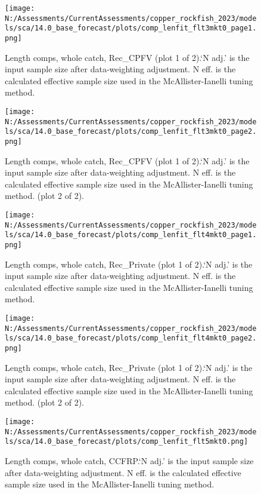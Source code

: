 \documentclass[11pt,
  english,
  letterpaper,
]{article}
\begin{document}
\begin{figure}
\centering
\texttt{[image: N:/Assessments/CurrentAssessments/copper\_rockfish\_2023/models/sca/14.0\_base\_forecast/plots/comp\_lenfit\_flt3mkt0\_page1.png]}
\caption{Length comps, whole catch, Rec\_CPFV (plot 1 of 2).`N adj.' is the input sample size after data-weighting adjustment. N eff. is the calculated effective sample size used in the McAllister-Ianelli tuning method.\label{fig:comp_lenfit_flt3mkt0_page1}}
\end{figure}

\begin{figure}
\centering
\texttt{[image: N:/Assessments/CurrentAssessments/copper\_rockfish\_2023/models/sca/14.0\_base\_forecast/plots/comp\_lenfit\_flt3mkt0\_page2.png]}
\caption{Length comps, whole catch, Rec\_CPFV (plot 1 of 2).`N adj.' is the input sample size after data-weighting adjustment. N eff. is the calculated effective sample size used in the McAllister-Ianelli tuning method. (plot 2 of 2).\label{fig:comp_lenfit_flt3mkt0_page2}}
\end{figure}

\begin{figure}
\centering
\texttt{[image: N:/Assessments/CurrentAssessments/copper\_rockfish\_2023/models/sca/14.0\_base\_forecast/plots/comp\_lenfit\_flt4mkt0\_page1.png]}
\caption{Length comps, whole catch, Rec\_Private (plot 1 of 2).`N adj.' is the input sample size after data-weighting adjustment. N eff. is the calculated effective sample size used in the McAllister-Ianelli tuning method.\label{fig:comp_lenfit_flt4mkt0_page1}}
\end{figure}

\begin{figure}
\centering
\texttt{[image: N:/Assessments/CurrentAssessments/copper\_rockfish\_2023/models/sca/14.0\_base\_forecast/plots/comp\_lenfit\_flt4mkt0\_page2.png]}
\caption{Length comps, whole catch, Rec\_Private (plot 1 of 2).`N adj.' is the input sample size after data-weighting adjustment. N eff. is the calculated effective sample size used in the McAllister-Ianelli tuning method. (plot 2 of 2).\label{fig:comp_lenfit_flt4mkt0_page2}}
\end{figure}

\begin{figure}
\centering
\texttt{[image: N:/Assessments/CurrentAssessments/copper\_rockfish\_2023/models/sca/14.0\_base\_forecast/plots/comp\_lenfit\_flt5mkt0.png]}
\caption{Length comps, whole catch, CCFRP.`N adj.' is the input sample size after data-weighting adjustment. N eff. is the calculated effective sample size used in the McAllister-Ianelli tuning method.\label{fig:comp_lenfit_flt5mkt0}}
\end{figure}
\end{document}
